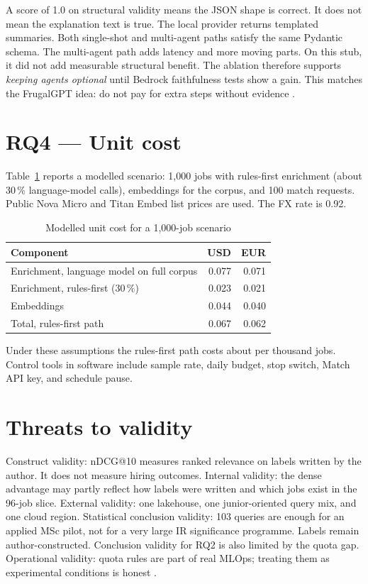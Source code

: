 A score of 1.0 on structural validity means the JSON shape is correct. It does not mean the explanation text is true. The local provider returns templated summaries. Both single-shot and multi-agent paths satisfy the same Pydantic schema. The multi-agent path adds latency and more moving parts. On this stub, it did not add measurable structural benefit. The ablation therefore supports \emph{keeping agents optional} until Bedrock faithfulness tests show a gain. This matches the FrugalGPT idea: do not pay for extra steps without evidence .

\section{RQ4 --- Unit cost}
\label{sec:rq4}

Table~\ref{tab:roi} reports a modelled scenario: 1{,}000 jobs with rules-first enrichment (about 30\,\% language-model calls), embeddings for the corpus, and 100 match requests. Public Nova Micro and Titan Embed list prices are used. The FX rate is 0.92.

\begin{table}[ht]
\centering
\caption{Modelled unit cost for a 1{,}000-job scenario}
\label{tab:roi}
\begin{tabular}{@{}lrr@{}}
\toprule
\textbf{Component} & \textbf{USD} & \textbf{EUR} \\
\midrule
Enrichment, language model on full corpus & 0.077 & 0.071 \\
Enrichment, rules-first (30\,\%) & 0.023 & 0.021 \\
Embeddings & 0.044 & 0.040 \\
Total, rules-first path & 0.067 & 0.062 \\
\bottomrule
\end{tabular}
\end{table}

Under these assumptions the rules-first path costs about  per thousand jobs. Control tools in software include sample rate, daily budget, stop switch, Match API key, and schedule pause.

\section{Threats to validity}
\label{sec:threats}

Construct validity: nDCG@10 measures ranked relevance on labels written by the author. It does not measure hiring outcomes. Internal validity: the dense advantage may partly reflect how labels were written and which jobs exist in the 96-job slice. External validity: one lakehouse, one junior-oriented query mix, and one cloud region. Statistical conclusion validity: 103 queries are enough for an applied MSc pilot, not for a very large IR significance programme. Labels remain author-constructed. Conclusion validity for RQ2 is also limited by the quota gap. Operational validity: quota rules are part of real MLOps; treating them as experimental conditions is honest .

